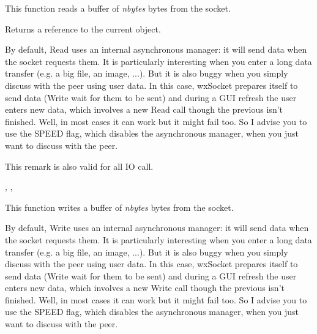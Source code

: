This function reads a buffer of {\it nbytes} bytes from the socket.





Returns a reference to the current object.


By default, Read uses an internal asynchronous manager: it will send data when
the socket requests them. It is particularly interesting when you enter a long
data transfer (e.g. a big file, an image, ...). But it is also buggy when you
simply discuss with the peer using user data. In this case, wxSocket prepares
itself to send data (Write wait for them to be sent) and during a GUI refresh
the user enters new data, which involves a new Read call though the previous
isn't finished. Well, in most cases it can work but it might fail too.
So I advise you to use the SPEED flag, which disables the asynchronous manager,
when you just want to discuss with the peer.

This remark is also valid for all IO call.


,
 ,

%
%
\label{wxsocketbasewrite}


This function writes a buffer of {\it nbytes} bytes from the socket.


By default, Write uses an internal asynchronous manager: it will send data when
the socket requests them. It is particularly interesting when you enter a long
data transfer (e.g. a big file, an image, ...). But it is also buggy when you
simply discuss with the peer using user data. In this case, wxSocket prepares
itself to send data (Write wait for them to be sent) and during a GUI refresh
the user enters new data, which involves a new Write call though the previous
isn't finished. Well, in most cases it can work but it might fail too.  
So I advise you to use the SPEED flag, which disables the asynchronous manager,
when you just want to discuss with the peer.

